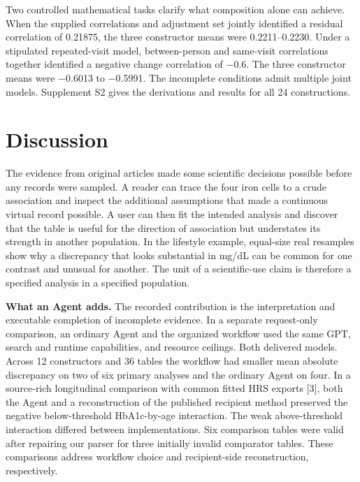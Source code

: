 \documentclass[sigconf,anonymous,nonacm]{acmart}
\begin{document}
Two controlled mathematical tasks clarify what composition alone can achieve. When the supplied correlations and adjustment set jointly identified a residual correlation of 0.21875, the three constructor means were 0.2211–\allowbreak{}0.2230. Under a stipulated repeated-visit model, between-person and same-visit correlations together identified a negative change correlation of −0.6. The three constructor means were −0.6013 to −0.5991. The incomplete conditions admit multiple joint models. Supplement S2 gives the derivations and results for all 24 constructions.


\section{Discussion}

The evidence from original articles made some scientific decisions possible before any records were sampled. A reader can trace the four iron cells to a crude association and inspect the additional assumptions that made a continuous virtual record possible. A user can then fit the intended analysis and discover that the table is useful for the direction of association but understates its strength in another population. In the lifestyle example, equal-size real resamples show why a discrepancy that looks substantial in mg/\allowbreak{}dL can be common for one contrast and unusual for another. The unit of a scientific-use claim is therefore a specified analysis in a specified population.


\textbf{What an Agent adds.} The recorded contribution is the interpretation and executable completion of incomplete evidence. In a separate request-only comparison, an ordinary Agent and the organized workflow used the same GPT, search and runtime capabilities, and resource ceilings. Both delivered models. Across 12 constructors and 36 tables the workflow had smaller mean absolute discrepancy on two of six primary analyses and the ordinary Agent on four. In a source-rich longitudinal comparison with common fitted HRS exports [3], both the Agent and a reconstruction of the published recipient method preserved the negative below-threshold HbA1c-by-age interaction. The weak above-threshold interaction differed between implementations. Six comparison tables were valid after repairing our parser for three initially invalid comparator tables. These comparisons address workflow choice and recipient-side reconstruction, respectively.
\end{document}
